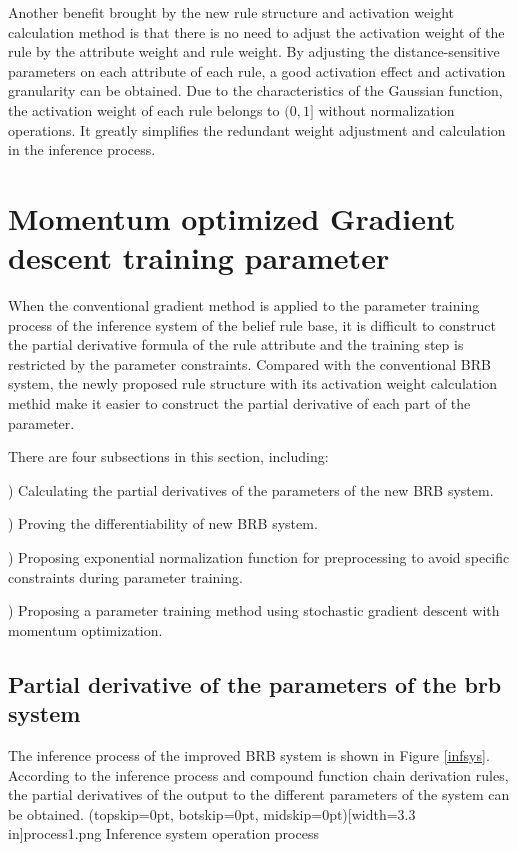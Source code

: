 \documentclass{ieeeaccess}
\begin{document}
Another benefit brought by the new rule structure and activation weight calculation method is that
there is no need to adjust the activation weight of the rule by the attribute weight and rule weight.
By adjusting the distance-sensitive parameters on each attribute of each rule, a good activation effect and activation granularity can be obtained.
Due to the characteristics of the Gaussian function, the activation weight of each rule belongs to $(0, 1]$ without normalization operations.
It greatly simplifies the redundant weight adjustment and calculation in the inference process.


\section{Momentum optimized Gradient descent training parameter}
When the conventional gradient method is applied to the parameter training process of the inference system of the belief rule base,
it is difficult to construct the partial derivative formula of the rule attribute and the training step is restricted by the parameter constraints.
Compared with the conventional BRB system, the newly proposed rule structure with its activation weight calculation methid make it easier to construct the partial derivative of each part of the parameter.

There are four subsections in this section, including:

) Calculating the partial derivatives of the parameters of the new BRB system.

) Proving the differentiability of new BRB system.

) Proposing exponential normalization function for preprocessing to avoid specific constraints during parameter training.

) Proposing a parameter training method using stochastic gradient descent with momentum optimization.


\subsection{Partial derivative of the parameters of the brb system}
The inference process of the improved BRB system is shown in Figure \ref{infsys}.
According to the inference process and compound function chain derivation rules, the partial derivatives of the output to the different parameters of the system can be obtained.
\Figure[!t](topskip=0pt, botskip=0pt, midskip=0pt)[width=3.3 in]{process1.png}
{Inference system operation process\label{infsys}}
\end{document}
